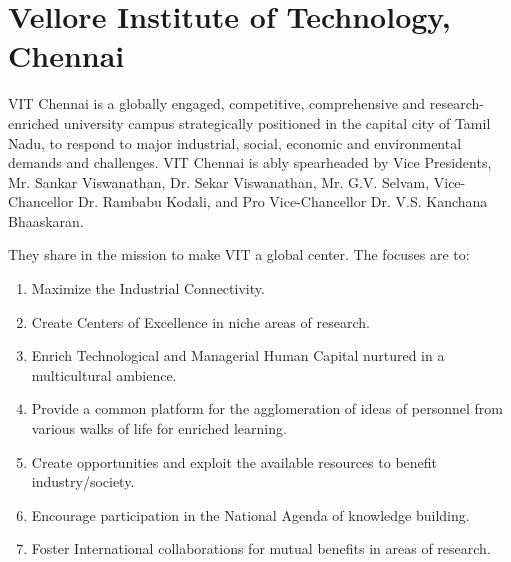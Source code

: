 
\section{Vellore Institute of Technology, Chennai}
VIT Chennai is a globally engaged, competitive, comprehensive and research-enriched university campus strategically positioned in the capital city of Tamil Nadu, to respond to major industrial, social, economic and environmental demands and challenges. VIT Chennai is ably spearheaded by Vice Presidents, Mr. Sankar Viswanathan, Dr. Sekar Viswanathan, Mr. G.V. Selvam, Vice-Chancellor Dr. Rambabu Kodali, and Pro Vice-Chancellor Dr. V.S. Kanchana Bhaaskaran. 

They share in the mission to make VIT a global center. The focuses are to:

\begin{enumerate}[label={\color{primaryColor}$\bullet$}]
	\item Maximize the Industrial Connectivity.
	\item Create Centers of Excellence in niche areas of research.
	\item Enrich Technological and Managerial Human Capital nurtured in a multicultural ambience.
	\item Provide a common platform for the agglomeration of ideas of personnel from various walks of life for enriched learning.
	\item Create opportunities and exploit the available resources to benefit industry/society.
	\item Encourage participation in the National Agenda of knowledge building.
	\item Foster International collaborations for mutual benefits in areas of research.
\end{enumerate}


